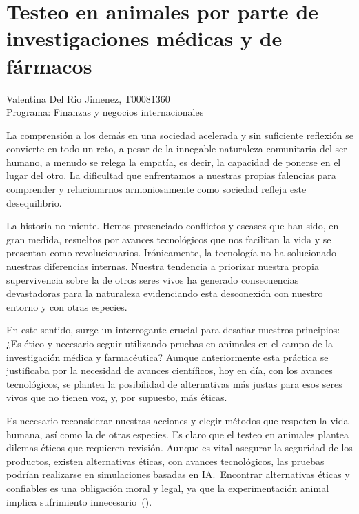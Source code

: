 \documentclass[letterpaper, 12pt]{report}
\begin{document}
\chapter*{Testeo en animales por parte de investigaciones médicas y de fármacos}

\noindent\makebox[\linewidth]{\rule{\textwidth}{0.4pt}}

\noindent
Valentina Del Rio Jimenez, T00081360 \\
Programa: Finanzas y negocios internacionales

\noindent\makebox[\linewidth]{\rule{\textwidth}{0.4pt}}

\nocite{*}

La comprensión a los demás en una sociedad acelerada y sin suficiente reflexión
se convierte en todo un reto, a pesar de la innegable naturaleza comunitaria
del ser humano, a menudo se relega la empatía, es decir, la capacidad de
ponerse en el lugar del otro. La dificultad que enfrentamos a nuestras propias
falencias para comprender y relacionarnos armoniosamente como sociedad refleja
este desequilibrio.

La historia no miente. Hemos presenciado conflictos y escasez que han sido,
en gran medida, resueltos por avances tecnológicos que nos facilitan la vida
y se presentan como revolucionarios. Irónicamente, la tecnología no ha
solucionado nuestras diferencias internas. Nuestra tendencia a priorizar
nuestra propia supervivencia sobre la de otros seres vivos ha generado
consecuencias devastadoras para la naturaleza evidenciando esta desconexión
con nuestro entorno y con otras especies.

En este sentido, surge un interrogante crucial para desafiar nuestros
principios: ¿Es ético y necesario seguir utilizando pruebas en animales
en el campo de la investigación médica y farmacéutica? Aunque anteriormente
esta práctica se justificaba por la necesidad de avances científicos, hoy en
día, con los avances tecnológicos, se plantea la posibilidad de alternativas
más justas para esos seres vivos que no tienen voz, y, por supuesto, más
éticas.

Es necesario reconsiderar nuestras acciones y elegir métodos que respeten
la vida humana, así como la de otras especies. Es claro que el testeo en
animales plantea dilemas éticos que requieren revisión. Aunque es vital
asegurar la seguridad de los productos, existen alternativas éticas, con
avances tecnológicos, las pruebas podrían realizarse en simulaciones basadas
en IA.~Encontrar alternativas éticas y confiables es una obligación moral y
legal, ya que la experimentación animal implica sufrimiento
innecesario~(\cite{Spielmann2001}).
\end{document}
